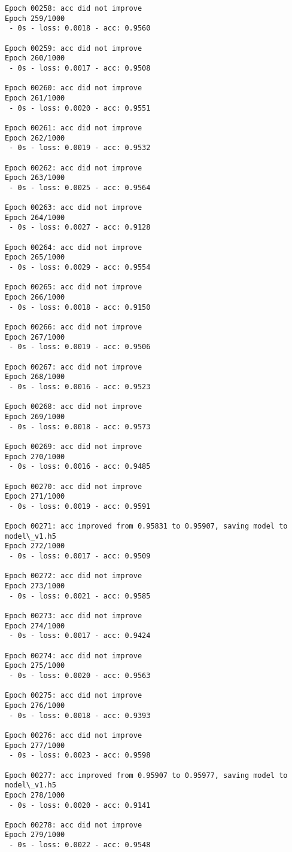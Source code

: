 \documentclass[11pt]{article}
\begin{document}
\begin{Verbatim}[commandchars=\\\{\}]
Epoch 00258: acc did not improve
Epoch 259/1000
 - 0s - loss: 0.0018 - acc: 0.9560

Epoch 00259: acc did not improve
Epoch 260/1000
 - 0s - loss: 0.0017 - acc: 0.9508

Epoch 00260: acc did not improve
Epoch 261/1000
 - 0s - loss: 0.0020 - acc: 0.9551

Epoch 00261: acc did not improve
Epoch 262/1000
 - 0s - loss: 0.0019 - acc: 0.9532

Epoch 00262: acc did not improve
Epoch 263/1000
 - 0s - loss: 0.0025 - acc: 0.9564

Epoch 00263: acc did not improve
Epoch 264/1000
 - 0s - loss: 0.0027 - acc: 0.9128

Epoch 00264: acc did not improve
Epoch 265/1000
 - 0s - loss: 0.0029 - acc: 0.9554

Epoch 00265: acc did not improve
Epoch 266/1000
 - 0s - loss: 0.0018 - acc: 0.9150

Epoch 00266: acc did not improve
Epoch 267/1000
 - 0s - loss: 0.0019 - acc: 0.9506

Epoch 00267: acc did not improve
Epoch 268/1000
 - 0s - loss: 0.0016 - acc: 0.9523

Epoch 00268: acc did not improve
Epoch 269/1000
 - 0s - loss: 0.0018 - acc: 0.9573

Epoch 00269: acc did not improve
Epoch 270/1000
 - 0s - loss: 0.0016 - acc: 0.9485

Epoch 00270: acc did not improve
Epoch 271/1000
 - 0s - loss: 0.0019 - acc: 0.9591

Epoch 00271: acc improved from 0.95831 to 0.95907, saving model to model\_v1.h5
Epoch 272/1000
 - 0s - loss: 0.0017 - acc: 0.9509

Epoch 00272: acc did not improve
Epoch 273/1000
 - 0s - loss: 0.0021 - acc: 0.9585

Epoch 00273: acc did not improve
Epoch 274/1000
 - 0s - loss: 0.0017 - acc: 0.9424

Epoch 00274: acc did not improve
Epoch 275/1000
 - 0s - loss: 0.0020 - acc: 0.9563

Epoch 00275: acc did not improve
Epoch 276/1000
 - 0s - loss: 0.0018 - acc: 0.9393

Epoch 00276: acc did not improve
Epoch 277/1000
 - 0s - loss: 0.0023 - acc: 0.9598

Epoch 00277: acc improved from 0.95907 to 0.95977, saving model to model\_v1.h5
Epoch 278/1000
 - 0s - loss: 0.0020 - acc: 0.9141

Epoch 00278: acc did not improve
Epoch 279/1000
 - 0s - loss: 0.0022 - acc: 0.9548


\end{Verbatim}
\end{document}
